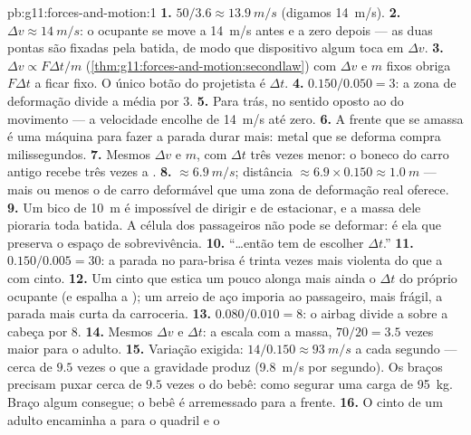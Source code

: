 \begin{solution}{pb:g11:forces-and-motion:1}
\textbf{1.} $50/3.6 \approx \qty{13.9}{m/s}$ (digamos \qty{14}{m/s}).
\textbf{2.} $\Delta v \approx \qty{14}{m/s}$: o ocupante se move a
\qty{14}{m/s} antes e a zero depois --- as duas pontas são fixadas pela
batida, de modo que dispositivo algum toca em $\Delta v$.
\textbf{3.} $\Delta v \propto F\Delta t/m$
(\cref{thm:g11:forces-and-motion:secondlaw}) com $\Delta v$ e $m$ fixos
obriga $F\Delta t$ a ficar fixo. O único botão do projetista é
$\Delta t$.
\textbf{4.} $0.150/0.050 = 3$: a zona de deformação divide a  média
por $3$.
\textbf{5.} Para trás, no sentido oposto ao do movimento --- a velocidade
encolhe de \qty{14}{m/s} até zero.
\textbf{6.} A frente que se amassa é uma máquina para fazer a parada
durar mais: metal que se deforma compra milissegundos.
\textbf{7.} Mesmos $\Delta v$ e $m$, com $\Delta t$ três vezes menor: o
boneco do carro antigo recebe três vezes a .
\textbf{8.}  $\approx \qty{6.9}{m/s}$; distância
$\approx 6.9 \times 0.150 \approx \qty{1.0}{m}$ --- mais ou menos o 
de carro deformável que uma zona de deformação real oferece.
\textbf{9.} Um bico de \qty{10}{m} é impossível de dirigir e de
estacionar, e a massa dele pioraria toda batida. A célula dos passageiros
não pode se deformar: é ela que preserva o espaço de sobrevivência.
\textbf{10.} ``\dots então tem de escolher $\Delta t$.''
\textbf{11.} $0.150/0.005 = 30$: a parada no para-brisa é trinta vezes
mais violenta do que a com cinto.
\textbf{12.} Um cinto que estica um pouco alonga mais ainda o $\Delta t$
do próprio ocupante (e espalha a ); um arreio de aço imporia ao
passageiro, mais frágil, a parada mais curta da carroceria.
\textbf{13.} $0.080/0.010 = 8$: o airbag divide a  sobre a cabeça
por $8$.
\textbf{14.} Mesmos $\Delta v$ e $\Delta t$: a  escala com a massa,
$70/20 = 3.5$ vezes maior para o adulto.
\textbf{15.} Variação exigida: $14/0.150 \approx \qty{93}{m/s}$ a cada
segundo --- cerca de $9.5$ vezes o que a gravidade produz
(\qty{9.8}{m/s} por segundo). Os braços precisam puxar cerca de $9.5$
vezes o  do bebê: como segurar uma carga de \qty{95}{kg}. Braço
algum consegue; o bebê é arremessado para a frente.
\textbf{16.} O cinto de um adulto encaminha a  para o quadril e o

\end{solution}
